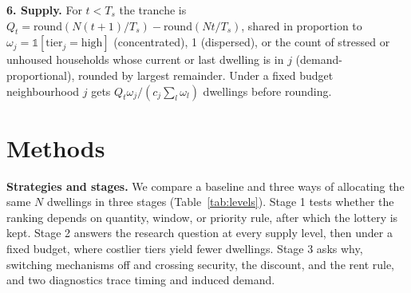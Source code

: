 \documentclass[10pt,a4paper]{article}
\begin{document}
\textbf{6. Supply.} For $t<T_s$ the tranche is $Q_t=\mathrm{round}(N(t+1)/T_s)-\mathrm{round}(Nt/T_s)$, shared in proportion to $\omega_j=\mathbb{1}[\text{tier}_j=\text{high}]$ (concentrated), 1 (dispersed), or the count of stressed or unhoused households whose current or last dwelling is in $j$ (demand-proportional), rounded by largest remainder. Under a fixed budget neighbourhood $j$ gets $Q_t\omega_j/(c_j\sum_l\omega_l)$ dwellings before rounding.


\section*{Methods}

\textbf{Strategies and stages.} We compare a baseline and three ways of allocating the same $N$ dwellings in three stages (Table~\ref{tab:levels}). Stage 1 tests whether the ranking depends on quantity, window, or priority rule, after which the lottery is kept. Stage 2 answers the research question at every supply level, then under a fixed budget, where costlier tiers yield fewer dwellings. Stage 3 asks why, switching mechanisms off and crossing security, the discount, and the rent rule, and two diagnostics trace timing and induced demand.
\end{document}
